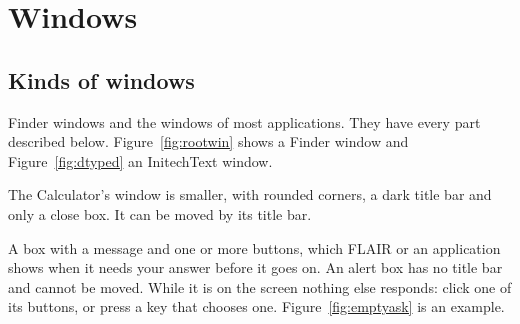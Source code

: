 \chapter{Windows}
\label{ch:windowsref}

\section{Kinds of windows}
Finder windows and the windows of most
applications.  They have every part described below.
Figure~\ref{fig:rootwin} shows a Finder window and Figure~\ref{fig:dtyped}
an InitechText window.

The Calculator's window is smaller, with
rounded corners, a dark title bar and only a close box.  It can be moved
by its title bar.

A box with a message and one or more buttons, which
FLAIR or an application shows when it needs your answer before it goes
on.  An alert box has no title bar and cannot be moved.  While it is on the
screen nothing else responds: click one of its buttons, or press a key
that chooses one.  Figure~\ref{fig:emptyask} is an example.

